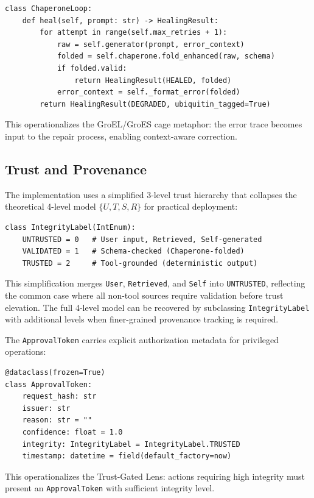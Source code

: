 \begin{verbatim}
class ChaperoneLoop:
    def heal(self, prompt: str) -> HealingResult:
        for attempt in range(self.max_retries + 1):
            raw = self.generator(prompt, error_context)
            folded = self.chaperone.fold_enhanced(raw, schema)
            if folded.valid:
                return HealingResult(HEALED, folded)
            error_context = self._format_error(folded)
        return HealingResult(DEGRADED, ubiquitin_tagged=True)
\end{verbatim}

This operationalizes the GroEL/GroES cage metaphor: the error trace becomes input to the
repair process, enabling context-aware correction.

\subsection{Trust and Provenance}

The implementation uses a simplified 3-level trust hierarchy that collapses the theoretical 4-level
model $\{U, T, S, R\}$ for practical deployment:

\begin{verbatim}
class IntegrityLabel(IntEnum):
    UNTRUSTED = 0   # User input, Retrieved, Self-generated
    VALIDATED = 1   # Schema-checked (Chaperone-folded)
    TRUSTED = 2     # Tool-grounded (deterministic output)
\end{verbatim}

This simplification merges \texttt{User}, \texttt{Retrieved}, and \texttt{Self} into \texttt{UNTRUSTED},
reflecting the common case where all non-tool sources require validation before trust elevation. The
full 4-level model can be recovered by subclassing \texttt{IntegrityLabel} with additional levels when
finer-grained provenance tracking is required.

The \texttt{ApprovalToken} carries explicit authorization metadata for privileged operations:

\begin{verbatim}
@dataclass(frozen=True)
class ApprovalToken:
    request_hash: str
    issuer: str
    reason: str = ""
    confidence: float = 1.0
    integrity: IntegrityLabel = IntegrityLabel.TRUSTED
    timestamp: datetime = field(default_factory=now)
\end{verbatim}

This operationalizes the Trust-Gated Lens: actions requiring high integrity must present an
\texttt{ApprovalToken} with sufficient integrity level.

